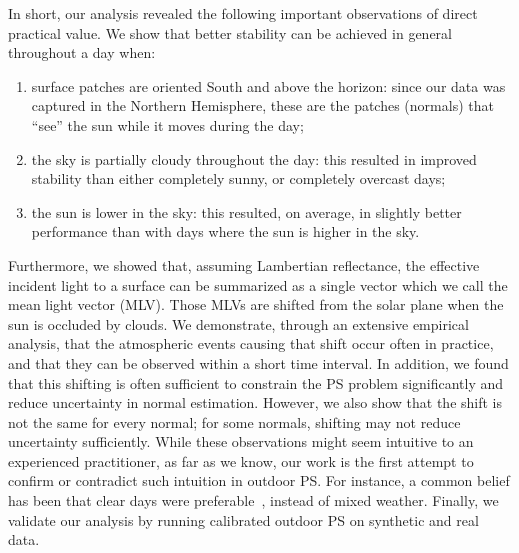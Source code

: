 In short, our analysis revealed the following important observations of direct practical value. We show that better stability can be achieved in general throughout a day when:
\begin{enumerate}
    \item surface patches are oriented South and above the horizon: since our data was captured in the Northern Hemisphere, these are the patches (normals) that ``see'' the sun while it moves during the day;
    \item the sky is partially cloudy throughout the day: this resulted in improved stability than either completely sunny, or completely overcast days;
    \item the sun is lower in the sky: this resulted, on average, in slightly better performance than with days where the sun is higher in the sky.
\end{enumerate}
Furthermore, we showed that, assuming Lambertian reflectance, the effective incident light to a surface can be summarized as a single vector which we call the mean light vector (MLV). Those MLVs are shifted from the solar plane when the sun is occluded by clouds. We demonstrate, through an extensive empirical analysis, that the atmospheric events causing that shift occur often in practice, and that they can be observed within a short time interval. In addition, we found that this shifting is often sufficient to constrain the PS problem significantly and reduce uncertainty in normal estimation. However, we also show that the shift is not the same for every normal; for some normals, shifting may not reduce uncertainty sufficiently.
While these observations might seem intuitive to an experienced practitioner, as far as we know, our work is the first attempt to confirm or contradict such intuition in outdoor PS. For instance, a common belief has been that clear days were preferable~\cite{yu-iccp-13,inose-tcva-13,ackermann-cvpr-12,abrams-eccv-12}, instead of mixed weather. Finally, we validate our analysis by running calibrated outdoor PS on synthetic and real data.

